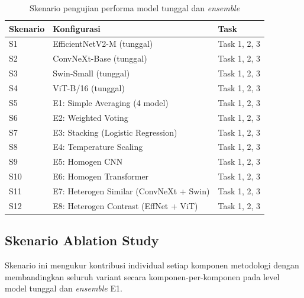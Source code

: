 \begin{table}[h]
    \centering
    \caption{Skenario pengujian performa model tunggal dan
    \textit{ensemble}}
    \label{table:skenario_uji}
    \begin{tabular}{|l|l|l|}
        \hline
        \textbf{Skenario} & \textbf{Konfigurasi} & \textbf{Task} \\
        \hline
        S1  & EfficientNetV2-M (tunggal)              & Task 1, 2, 3 \\
        S2  & ConvNeXt-Base (tunggal)                 & Task 1, 2, 3 \\
        S3  & Swin-Small (tunggal)                    & Task 1, 2, 3 \\
        S4  & ViT-B/16 (tunggal)                      & Task 1, 2, 3 \\
        S5  & E1: Simple Averaging (4 model)          & Task 1, 2, 3 \\
        S6  & E2: Weighted Voting                     & Task 1, 2, 3 \\
        S7  & E3: Stacking (Logistic Regression)      & Task 1, 2, 3 \\
        S8  & E4: Temperature Scaling                 & Task 1, 2, 3 \\
        S9  & E5: Homogen CNN                         & Task 1, 2, 3 \\
        S10 & E6: Homogen Transformer                 & Task 1, 2, 3 \\
        S11 & E7: Heterogen Similar (ConvNeXt + Swin) & Task 1, 2, 3 \\
        S12 & E8: Heterogen Contrast (EffNet + ViT)   & Task 1, 2, 3 \\
        \hline
    \end{tabular}
\end{table}

\subsection{Skenario Ablation Study}
Skenario ini mengukur kontribusi individual setiap komponen metodologi
dengan membandingkan seluruh variant secara komponen-per-komponen pada
level model tunggal dan \textit{ensemble} E1. \par

